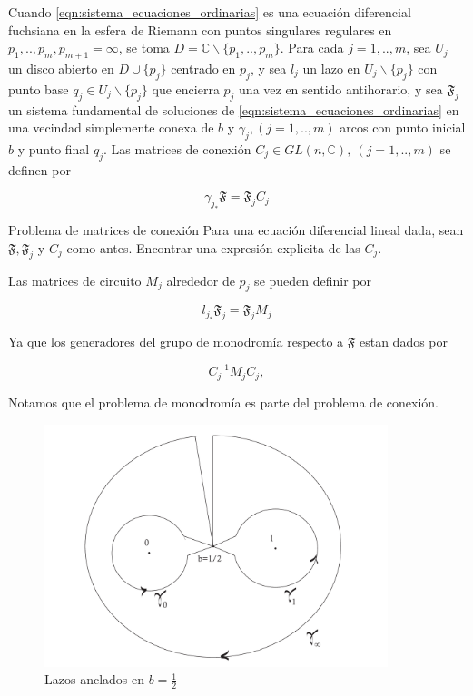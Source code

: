Cuando \ref{eqn:sistema_ecuaciones_ordinarias} es una ecuaci\'on diferencial fuchsiana en la esfera de Riemann con puntos singulares regulares en $p_{1},..,p_{m},p_{m+1} = \infty$, se toma $D= \mathbb{C} \backslash \lbrace p_{1},..,p_{m} \rbrace$. Para cada $j=1,..,m$, sea $U_{j}$ un disco abierto en $D \cup \lbrace p_{j}\rbrace$ centrado en $p_{j}$, y sea $\textit{l} _{j}$ un lazo en $U_{j} \backslash \lbrace p_{j} \rbrace$ con punto base $q_{j} \in U_{j} \backslash \lbrace p_{j} \rbrace$ que encierra $p_{j} $ una vez en sentido antihorario, y sea $\mathfrak{F}_{j}$ un sistema fundamental de soluciones de \ref{eqn:sistema_ecuaciones_ordinarias}  en una vecindad simplemente conexa de $b$ y $\gamma_{j}, (j=1,..,m)$  arcos con punto inicial $b$ y punto final $q_{j}$. Las matrices de conexi\'on $C_{j} \in  GL(n, \mathbb{C}), \ (j=1,..,m)$ se definen por

\begin{equation}\label{eqn:matcon1}
  \gamma_{j_{*}} \mathfrak{F} = \mathfrak{F}_{j} C_{j}
\end{equation}

\begin{prob}{Problema de matrices de conexi\'on} Para una ecuaci\'on diferencial lineal dada, sean $\mathfrak{F}, \mathfrak{F}_{j}$ y $C_{j}$ como antes. Encontrar una expresi\'on explicita de las $C_{j}$.

Las matrices de circuito $M_{j}$ alrededor de $p_{j}$ se pueden definir por

\begin{equation}\label{eqn:matcon2}
 \textit{l} _{j_{*}} \mathfrak{F}_{j} = \mathfrak{F}_{j} M_{j}
\end{equation}

\end{prob}

Ya que los generadores del grupo de monodrom\'ia respecto a $\mathfrak{F}$ estan dados por

$$C_{j}^{-1} M_{j} C_{j} ,$$

Notamos que el problema de monodrom\'ia es parte del problema de conexi\'on.



\begin{figure}[h] \label{lazos3}
  \centering
  \includegraphics[width=10cm]{lazos3.pdf}
  \caption{Lazos anclados en $b=\frac{1}{2}$} \label{lazos3}
\end{figure}


